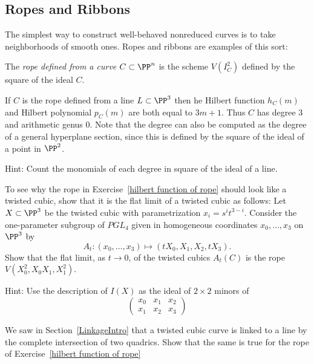\subsection{Ropes and Ribbons}
The simplest way to construct well-behaved nonreduced curves is
to take neighborhoods of smooth ones. Ropes and ribbons are examples of this sort:


\begin{definition}
The \emph{rope defined from a curve $C \subset \PP^n$} is the scheme $V(I^2_C)$ defined by the square of the ideal $C$.
\end{definition}

\begin{exercise}\label{hilbert function of rope}
If $C$ is the rope defined from a line $L\subset \PP^3$ then he Hilbert function $h_C(m)$ and Hilbert polynomial $p_C(m)$ are both equal to $3m+1$. Thus $C$ has degree 3 and
arithmetic genus 0. Note that the degree can also be computed as the degree of 
a general hyperplane section, since this is defined by the square of the ideal of a point
in $\PP^2$.

Hint: Count the monomials of each degree in square of the ideal of a line. 
\end{exercise}

\begin{exercise} To see why the rope in Exercise~\ref{hilbert function of rope} should look like a twisted cubic, show that it is the flat limit of a twisted cubic as follows:
 Let $X \subset \PP^3$ be the twisted cubic with parametrization $x_i = s^it^{3-i}$. Consider the one-parameter subgroup of $PGL_4$ given in homogeneous coordinates $x_0,\dots, x_3$ on $\PP^3$ by
$$
A_t : (x_0,\dots,x_3) \mapsto (tX_0, X_1, X_2,tX_3).
$$
Show that the flat limit, as $t\to 0$, of the twisted cubics $A_t(C)$ is the rope $V(X_0^2, X_0X_1,X_1^2)$.

Hint: Use the description of $I(X)$ as the ideal of $2\times 2$ minors of
$$
\begin{pmatrix}
 x_0 &x_1&x_2\\
x_1& x_2& x_3
\end{pmatrix}
$$
\end{exercise}
 
 
\begin{exercise}\label{line and rope}
We saw in Section~\ref{LinkageIntro} that a twisted cubic curve is linked to a line by the complete intersection
 of two quadrics. Show that the same is true for the rope of Exercise~\ref{hilbert function of rope} 
\end{exercise}
 

